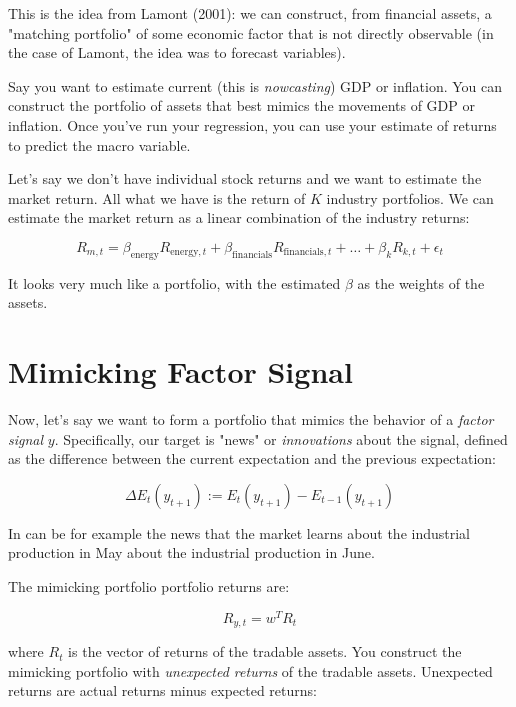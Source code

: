 This is the idea from Lamont (2001): 
we can construct, from financial assets, 
a "matching portfolio" of some economic factor
that is not directly observable (in the case of 
Lamont, the idea was to forecast variables).

Say you want to estimate current (this is \textit{nowcasting})
GDP or inflation. You can construct the portfolio 
of assets that best mimics the movements of GDP or inflation.
Once you've run your regression, you can use your 
estimate of returns to predict the macro variable.

Let's say we don't have individual 
stock returns and we want to estimate 
the market return. All what we have is
the return of $K$ industry portfolios. We 
can estimate the market return as a 
linear combination of the industry returns:

\begin{equation}
R_{m,t} = \beta_{\text{energy}} R_{\text{energy},t} + \beta_{\text{financials}} R_{\text{financials},t} + \ldots + \beta_{k} R_{k,t} + \epsilon_{t}
\end{equation}

It looks very much like a portfolio, with 
the estimated $\beta$ as the weights of the assets.

\section{Mimicking Factor Signal}

Now, let's say we want to form a portfolio that 
mimics the behavior of a \textit{factor signal} $y$.
Specifically, our target is "news" or \textit{innovations} about the signal,
defined as the difference between the current expectation 
and the previous expectation:

\begin{equation}
    \Delta E_t(y_{t+1}) := E_t(y_{t+1}) - E_{t-1}(y_{t+1})
\end{equation}

In can be for example the news that the market 
learns about the industrial production in May about 
the industrial production in June.

The mimicking portfolio portfolio returns are:

\begin{equation}
    R_{y, t} = w^T R_t
\end{equation}

where $R_t$ is the vector of returns of the tradable assets.
You construct the mimicking portfolio with 
\textit{unexpected returns} of the tradable assets. Unexpected 
returns are actual returns minus expected returns:

